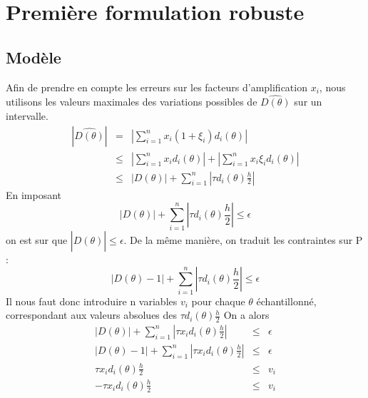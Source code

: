 \section{Première formulation robuste}
\subsection{Modèle}
Afin de prendre en compte les erreurs sur les facteurs d'amplification $x_i$, nous utilisons les valeurs maximales des variations possibles de $\hat{D(\theta)}$ sur un intervalle.\\
\begin{eqnarray}
|\hat{D(\theta)}| & = & |\sum_{i=1}^{n} x_i(1+\xi_i)d_i(\theta)| \nonumber \\
& \leq & |\sum_{i=1}^{n} x_i d_i(\theta)| + |\sum_{i=1}^{n} x_i \xi_i d_i(\theta)| \nonumber \\
& \leq & |D(\theta)| + \sum_{i=1}^{n} |\tau d_i(\theta)\frac{h}{2}| \nonumber
\end{eqnarray}
En imposant 
$$|D(\theta)| + \sum_{i=1}^{n} |\tau d_i(\theta)\frac{h}{2}|\leq \epsilon $$
on est sur que $|\hat{D(\theta)}|\leq \epsilon$. De la même manière, on traduit les contraintes sur P : 
$$|D(\theta)-1| + \sum_{i=1}^{n} |\tau d_i(\theta)\frac{h}{2}|\leq \epsilon $$
Il nous faut donc introduire n variables $v_i$ pour chaque $\theta$ échantillonné, correspondant aux valeurs absolues des $\tau d_i(\theta)\frac{h}{2}$
On a alors 
\begin{eqnarray}
|D(\theta)| + \sum_{i=1}^{n} |\tau x_i d_i(\theta)\frac{h}{2}| & \leq & \epsilon \nonumber \\
|D(\theta)-1| + \sum_{i=1}^{n} |\tau x_i d_i(\theta)\frac{h}{2}| & \leq & \epsilon \nonumber \\
\tau x_i d_i(\theta)\frac{h}{2} & \leq & v_i \nonumber \\
-\tau x_i d_i(\theta)\frac{h}{2} & \leq & v_i \nonumber 
\end{eqnarray}


